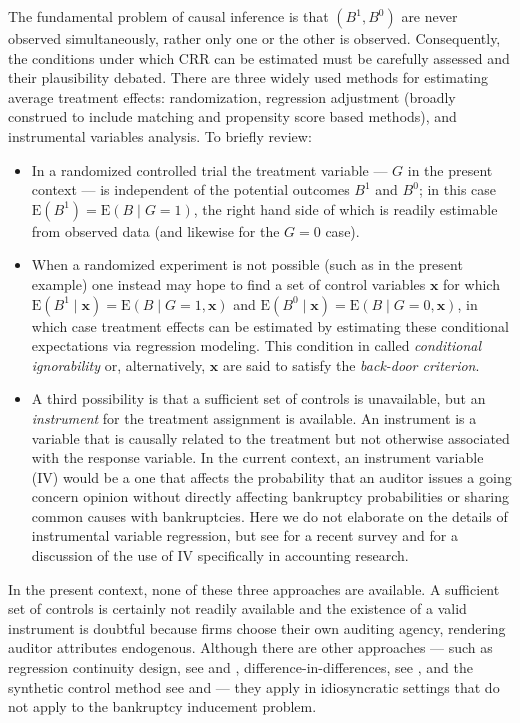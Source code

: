 \documentclass[aoas,preprint, 11pt, dvipsnames, table, x11name]{imsart}
\newcommand{\E}{\mbox{E}}
\theoremstyle{remark}
\begin{document}
The fundamental problem of causal inference \citep{Holland-1986} is that $(B^1, B^0)$ are never observed simultaneously, rather only one or the other is observed. Consequently, the conditions under which CRR can be estimated must be carefully assessed and their plausibility debated. There are three widely used methods for estimating average treatment effects: randomization, regression adjustment (broadly construed to include matching and propensity score based methods), and instrumental variables analysis. To briefly review:
\begin{itemize}
\item In a randomized controlled trial the treatment variable --- $G$ in the present context --- is independent of the potential outcomes $B^1$ and $B^0$; in this case $\E(B^1) = \E(B \mid G = 1)$, the right hand side of which is readily estimable from observed data (and likewise for the $G = 0$ case). 

\item When a randomized experiment is not possible (such as in the present example) one instead may hope to find a set of control variables $\mathbf{x}$ for which $\E(B^1 \mid \mathbf{x}) = \E(B \mid G = 1, \mathbf{x})$ and $\E(B^0 \mid \mathbf{x}) = \E(B \mid G = 0, \mathbf{x})$, in which case treatment effects can be estimated by estimating these conditional expectations via regression modeling. This condition in called {\em conditional ignorability} or, alternatively, $\mathbf{x}$ are said to satisfy the {\em back-door criterion}. 

\item A third possibility is that a sufficient set of controls is unavailable, but an {\em instrument} for the treatment assignment is available. An instrument is a variable that is causally related to the treatment but not otherwise associated with the response variable. In the current context, an instrument variable (IV) would be a one that affects the probability that an auditor issues a going concern opinion without directly affecting bankruptcy probabilities or sharing common causes with bankruptcies. 
Here we do not elaborate on the details of instrumental variable regression, but see \cite{imbens2014instrumental} for a recent survey and \cite{larcker2010use} for a discussion of the use of IV specifically in accounting research.
\end{itemize}
In the present context, none of these three approaches are available. A sufficient set of controls is certainly not readily available and the existence of a valid instrument is doubtful because firms choose their own auditing agency, rendering auditor attributes endogenous. Although there are other approaches --- such as regression continuity design, see \cite{Imbens-rdd} and \cite{Thistlethwaite-rdd}, difference-in-differences, see  \cite{card1994}, and the synthetic control method see \cite{abadie2010} and \cite{abadie2003} --- they apply in idiosyncratic settings that do not apply to the bankruptcy inducement problem. 
\end{document}
